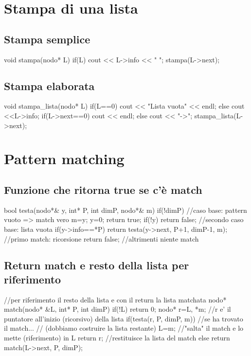 \section{Stampa di una lista}


\subsection{Stampa semplice}
\begin{codice}

void stampa(nodo* L) {
    if(L) {
        cout << L->info << " ";
        stampa(L->next);
    }
}
\end{codice}

\subsection{Stampa elaborata}
\begin{codice}

void stampa_lista(nodo* L) {
    if(L==0) cout << "Lista vuota" << endl;
    else {
        cout <<L->info;
        if(L->next==0) cout << endl;
        else {
            cout << "->";
            stampa_lista(L->next);
        }
    } 
}
\end{codice}


\section{Pattern matching}
\subsection{Funzione che ritorna true se c’è match}
\begin{codice}

bool testa(nodo*& y, int* P, int dimP, nodo*& m){
if(!dimP) {  //caso base: pattern vuoto => match vero
    m=y;
          y=0;
    return true;
}
if(!y) return false; //secondo caso base: lista vuota
if(y->info==*P) return testa(y->next, P+1, dimP-1, m); //primo match: ricorsione
return false; //altrimenti niente match
}
\end{codice}

\subsection{Return match e resto della lista per riferimento}
\begin{codice}

//per riferimento il resto della lista e con il return la lista matchata
nodo* match(nodo* &L, int* P, int dimP) {
if(!L) return 0;
nodo* r=L, *m;  //r e' il puntatore all'inizio (ricorsivo) della lista
if(testa(r, P, dimP, m)) {  //se ha trovato il match...
// (dobbiamo costruire la lista restante)
    L=m; //"salta" il match e lo mette (riferimento) in L
    return r; //restituisce la lista del match
}
else return match(L->next, P, dimP);
}
\end{codice}

